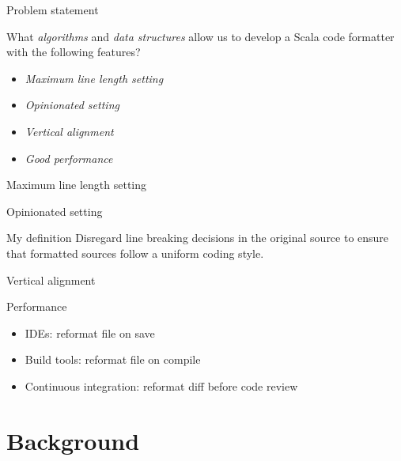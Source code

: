 \documentclass[xcolor=dvipsnames]{beamer}
\theoremstyle{definition}
\begin{document}
\begin{frame}{Problem statement}
  \begin{block}{}
    What \emph{algorithms} and \emph{data structures} allow us to develop a
    Scala code formatter with the following features?
    \begin{itemize}
      \item \emph{Maximum line length setting}
      \item \emph{Opinionated setting}
      \item \emph{Vertical alignment}
      \item \emph{Good performance}
    \end{itemize}
  \end{block}
\end{frame}

\begin{frame}{Maximum line length setting}
  
\end{frame}

\begin{frame}{Opinionated setting}
  \begin{block}{My definition}
    Disregard line breaking decisions in the original source to ensure that
    formatted sources follow a uniform coding style.
  \end{block}
  
\end{frame}

\begin{frame}{Vertical alignment}
  
\end{frame}

\begin{frame}{Performance}
  \begin{itemize}
    \item IDEs: reformat file on save
    \item Build tools: reformat file on compile
    \item Continuous integration: reformat diff before code review
  \end{itemize}
\end{frame}

\section{Background} %
\label{sec:Background}
\end{document}
